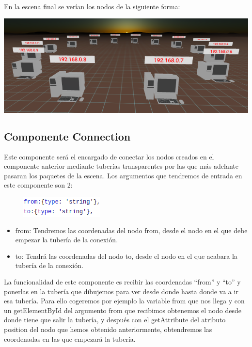 \documentclass[a4paper, 12pt]{book}
\begin{document}
En la escena final se verían los nodos de la siguiente forma:
\begin{center}
    \includegraphics[scale=0.4]{img/componenteNode_modelo.png}
\end{center}


\subsection{Componente Connection}

Este componente será el encargado de conectar los nodos creados en el componente anterior mediante tuberías transparentes por las que más adelante pasaran los paquetes de la escena.
Los argumentos que tendremos de entrada en este componente son 2:


\begin{figure}[h]
\centering
    \includegraphics[scale=0.7]{img/arg_comp_connect.png}
\end{figure}

\begin{itemize}
    \item from: Tendremos las coordenadas del nodo from, desde el nodo en el que debe empezar la tubería de la conexión.
    
    \item to: Tendrá las coordenadas del nodo to, desde el nodo en el que acabara la tubería de la conexión.
    
\end{itemize}

La funcionalidad de este componente es recibir las coordenadas “from” y “to” y ponerlas en la tubería que dibujemos para ver desde donde hasta donde va a ir esa tubería.
Para ello cogeremos por ejemplo la variable from que nos llega y con un getElementById del argumento from que recibimos obtenemos el nodo desde donde tiene que salir la tubería, y después con el getAttribute del atributo position del nodo que hemos obtenido anteriormente, obtendremos las coordenadas en las que empezará la tubería.
\end{document}
